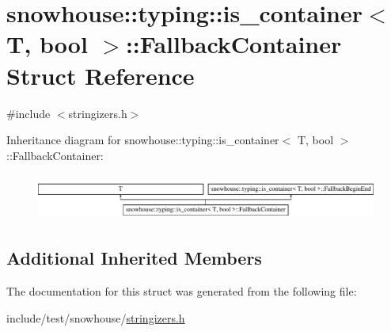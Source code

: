 \hypertarget{structsnowhouse_1_1typing_1_1is__container_1_1FallbackContainer}{}\section{snowhouse\+::typing\+::is\+\_\+container$<$ T, bool $>$\+::Fallback\+Container Struct Reference}
\label{structsnowhouse_1_1typing_1_1is__container_1_1FallbackContainer}


{\ttfamily \#include $<$stringizers.\+h$>$}

Inheritance diagram for snowhouse\+::typing\+::is\+\_\+container$<$ T, bool $>$\+::Fallback\+Container\+:\begin{figure}[H]
\begin{center}
\leavevmode
\includegraphics[height=1.509434cm]{structsnowhouse_1_1typing_1_1is__container_1_1FallbackContainer}
\end{center}
\end{figure}
\subsection*{Additional Inherited Members}


The documentation for this struct was generated from the following file\+:\begin{DoxyCompactItemize}
\item 
include/test/snowhouse/\mbox{\hyperlink{stringizers_8h}{stringizers.\+h}}\end{DoxyCompactItemize}
